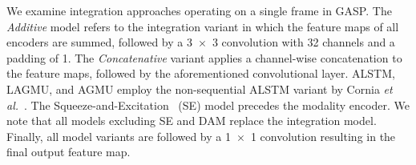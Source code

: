 \documentclass{article}
\begin{document}
\begin{table}[H]
\centering
\caption{Static integration results. Top rows represent non-fusion methods and bottom rows are fusion-based integration approaches.}
\label{tab:feedforward_res}
\end{table}

We examine integration approaches operating on a single frame in GASP. The \textit{Additive} model refers to the integration variant in which the feature maps of all encoders are summed, followed by a 3~$\times$~3 convolution with 32 channels and a padding of 1. The \textit{Concatenative} variant applies a channel-wise concatenation to the feature maps, followed by the aforementioned convolutional layer. ALSTM, LAGMU, and AGMU employ the non-sequential ALSTM variant by Cornia \textit{et al.}~. The Squeeze-and-Excitation~\cite{hu2018squeeze} (SE) model precedes the modality encoder. We note that all models excluding SE and DAM replace the integration model. Finally, all model variants are followed by a 1~$\times$~1 convolution resulting in the final output feature map.
\end{document}
